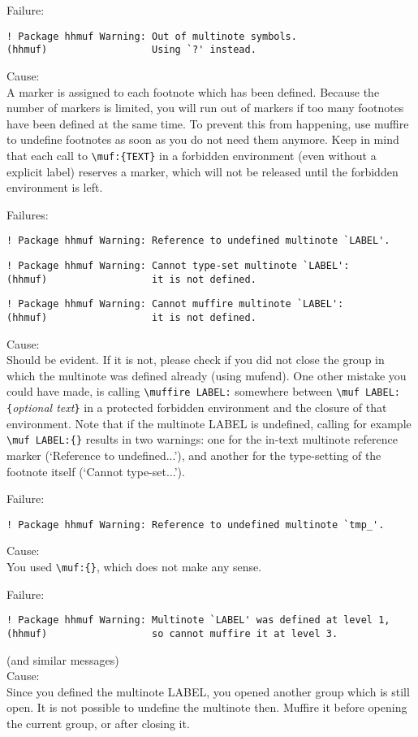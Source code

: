 \documentclass[11pt]{article}
\makeatletter
\def\macroname#1{{\ttfamily\@ttbs#1}}  %
\def\={\verb=}
\def\<#1>{\macroname{#1}}
\makeatother
\begin{document}
Failure:
\begin{verbatim}
! Package hhmuf Warning: Out of multinote symbols.
(hhmuf)                  Using `?' instead.
\end{verbatim}
Cause:\\
A marker is assigned to each footnote which has been defined. Because
the number of markers is limited, you will run out of markers if
too many footnotes have been defined at the same time. To prevent this
from happening, use \<muffire> to undefine footnotes as soon as you
do not need them anymore.
Keep in mind that each call to \=\muf:{TEXT}= in a forbidden environment
(even without a explicit label) reserves a marker, which will not be
released until the forbidden environment is left.

Failures:
\begin{verbatim}
! Package hhmuf Warning: Reference to undefined multinote `LABEL'.
\end{verbatim}
\begin{verbatim}
! Package hhmuf Warning: Cannot type-set multinote `LABEL':
(hhmuf)                  it is not defined.
\end{verbatim}
\begin{verbatim}
! Package hhmuf Warning: Cannot muffire multinote `LABEL':
(hhmuf)                  it is not defined.
\end{verbatim}
Cause:\\
Should be evident. If it is not, please check if you did not close
the group in which the multinote was defined already (using \<mufend>).
One other mistake you could have made, is calling \=\muffire LABEL:=
somewhere between \=\muf LABEL:{=\textit{optional text}\=}= in a
protected forbidden environment and the closure of that environment.
Note that if the multinote LABEL is undefined, calling for example
\=\muf LABEL:{}= results in two warnings: one for the in-text
multinote reference marker (`Reference to undefined...'), and another
for the type-setting of the footnote itself (`Cannot type-set...').

Failure:
\begin{verbatim}
! Package hhmuf Warning: Reference to undefined multinote `tmp_'.
\end{verbatim}
Cause:\\
You used \=\muf:{}=, which does not make any sense.

Failure:
\begin{verbatim}
! Package hhmuf Warning: Multinote `LABEL' was defined at level 1,
(hhmuf)                  so cannot muffire it at level 3.
\end{verbatim}
(and similar messages)\\
Cause:\\
Since you defined the multinote LABEL, you opened another group which
is still open. It is not possible to undefine the multinote then.
Muffire it before opening the current group, or after closing it.
\end{document}
